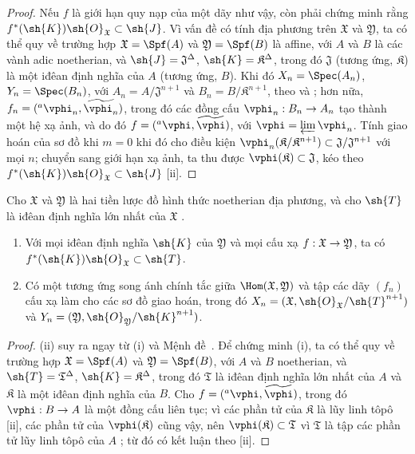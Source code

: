 \documentclass[oneside]{amsart}
\makeatletter
\newcommand{\ega@arrow}[2]{\mathchoice{#1}{#2}{#2}{#2}}
\renewcommand{\to}{\ega@arrow{\longrightarrow}{\rightarrow}}
\let\EGAOriginalLabel\label
\renewcommand{\label}[1]{\phantomsection\EGAOriginalLabel{#1}}
\makeatother
\begin{document}
\begin{proof}
Nếu $f$ là giới hạn quy nạp của một dãy như vậy, còn phải chứng minh rằng $f^*(\sh{K})\sh{O}_\mathfrak{X}\subset\sh{J}$.
Vì vấn đề có tính địa phương trên $\mathfrak{X}$ và $\mathfrak{Y}$, ta có thể quy về trường hợp $\mathfrak{X}=\Spf(A)$ và $\mathfrak{Y}=\Spf(B)$ là affine, với $A$ và $B$ là các vành adic noetherian, và $\sh{J}=\mathfrak{J}^\Delta$, $\sh{K}=\mathfrak{K}^\Delta$, trong đó $\mathfrak{J}$ (tương ứng, $\mathfrak{K}$) là một iđêan định nghĩa của $A$ (tương ứng, $B$).
Khi đó $X_n=\Spec(A_n)$, $Y_n=\Spec(B_n)$, với $A_n=A/\mathfrak{J}^{n+1}$ và $B_n=B/\mathfrak{K}^{n+1}$, theo  và ; hơn nữa, $f_n=({}^a\vphi_n,\widetilde{\vphi_n})$, trong đó các đồng cấu $\vphi_n:B_n\to A_n$ tạo thành một hệ xạ ảnh, và do đó $f=({}^a\vphi,\widetilde{\vphi})$, với $\vphi=\varprojlim\vphi_n$.
Tính giao hoán của sơ đồ  khi $m=0$ khi đó cho điều kiện $\vphi_n(\mathfrak{K}/\mathfrak{K}^{n+1})\subset\mathfrak{J}/\mathfrak{J}^{n+1}$ với mọi $n$; chuyển sang giới hạn xạ ảnh, ta thu được $\vphi(\mathfrak{K})\subset\mathfrak{J}$, kéo theo $f^*(\sh{K})\sh{O}_\mathfrak{X}\subset\sh{J}$ [ii].
\end{proof}

\begin{corollary}[10.6.10]
\label{I.10.6.10}
Cho $\mathfrak{X}$ và $\mathfrak{Y}$ là hai tiền lược đồ hình thức noetherian địa phương, và cho $\sh{T}$ là iđêan định nghĩa lớn nhất của $\mathfrak{X}$ .
\begin{enumerate}
  \item[\rm{(i)}] Với mọi iđêan định nghĩa $\sh{K}$ của $\mathfrak{Y}$ và mọi cấu xạ $f:\mathfrak{X}\to\mathfrak{Y}$, ta có $f^*(\sh{K})\sh{O}_\mathfrak{X}\subset\sh{T}$.
  \item[\rm{(ii)}] Có một tương ứng song ánh chính tắc giữa $\Hom(\mathfrak{X},\mathfrak{Y})$ và tập các dãy $(f_n)$ cấu xạ làm cho các sơ đồ  giao hoán, trong đó $X_n=(\mathfrak{X},\sh{O}_\mathfrak{X}/\sh{T}^{n+1})$ và $Y_n=(\mathfrak{Y},\sh{O}_\mathfrak{Y}/\sh{K}^{n+1})$.
\end{enumerate}
\end{corollary}

\begin{proof}
(ii) suy ra ngay từ (i) và Mệnh đề~.
Để chứng minh (i), ta có thể quy về trường hợp $\mathfrak{X}=\Spf(A)$ và $\mathfrak{Y}=\Spf(B)$, với $A$ và $B$ noetherian, và $\sh{T}=\mathfrak{T}^\Delta$, $\sh{K}=\mathfrak{K}^\Delta$, trong đó $\mathfrak{T}$ là iđêan định nghĩa lớn nhất của $A$ và $\mathfrak{K}$ là một iđêan định nghĩa của $B$.
Cho $f=({}^a\vphi,\widetilde{\vphi})$, trong đó $\vphi:B\to A$ là một đồng cấu liên tục; vì các phần tử của $\mathfrak{K}$ là lũy linh tôpô [ii], các phần tử của $\vphi(\mathfrak{K})$ cũng vậy, nên $\vphi(\mathfrak{K})\subset\mathfrak{T}$ vì $\mathfrak{T}$ là tập các phần tử lũy linh tôpô của $A$ ; từ đó có kết luận theo [ii].
\end{proof}
\end{document}
